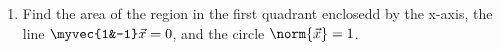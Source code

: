 \renewcommand{\theequation}{\theenumi}
\begin{enumerate}[label=\arabic*.,ref=\thesubsubsection.\theenumi]
%
\item Find the area of the region in the first quadrant enclosedd by the x-axis, the line $\myvec{1&-1}\vec{x} = 0$, and the circle $\norm{\vec{x}} = 1 $.

\end{enumerate}